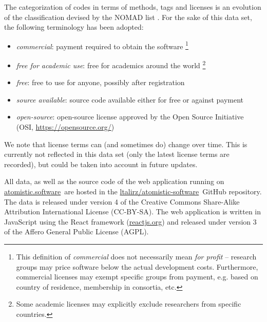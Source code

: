 \documentclass[9pt,review]{livecoms}
\newcommand{\atsoft}{\href{https://atomistic.software}{atomistic.software}\ }
\newcommand{\atsoftgit}{\href{https://github.com/ltalirz/atomistic-software}{ltalirz/atomistic-software}\ }
\begin{document}
The categorization of codes in terms of methods, tags and licenses is an evolution of the classification devised by the NOMAD list \cite{Ghiringhelli2017}.
For the sake of this data set, the following terminology has been adopted:
\begin{itemize}
    \item \emph{commercial}: payment required to obtain the software%
\footnote{This definition of \emph{commercial} does not necessarily mean \emph{for profit} -- 
research groups may price software below the actual development costs.
Furthermore, commercial licenses may exempt specific groups from payment, e.g. based on country of residence, membership in consortia, etc.
}
    \item \emph{free for academic use}: free for academics around the world%
\footnote{Some academic licenses may explicitly exclude researchers from specific countries.}
    \item \emph{free}: free to use for anyone, possibly after registration
    \item \emph{source available}: source code available either for free or against payment
    \item \emph{open-source}: open-source license approved by the Open Source Initiative (OSI, \url{https://opensource.org/})
\end{itemize}

We note that license terms can (and sometimes do) change over time. 
This is currently not reflected in this data set (only the latest license terms are recorded), but could be taken into account in future updates.

All data, as well as the source code of the web application running on \atsoft are hosted in the \atsoftgit GitHub repository.
The data is released under version 4 of the Creative Commons Share-Alike Attribution International License (CC-BY-SA).
The web application is written in JavaScript using the React framework (\url{reactjs.org}) and released under version 3 of the Affero General Public License (AGPL).
\end{document}
